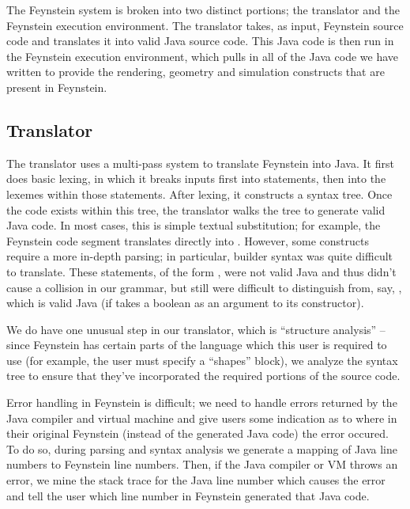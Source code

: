 The Feynstein system is broken into two distinct portions; the
translator and the Feynstein execution environment. The translator
takes, as input, Feynstein source code and translates it into valid
Java source code. This Java code is then run in the Feynstein
execution environment, which pulls in all of the Java code we have
written to provide the rendering, geometry and simulation constructs
that are present in Feynstein.

\subsection{Translator}

The translator uses a multi-pass system to translate Feynstein into
Java. It first does basic lexing, in which it breaks inputs first into
statements, then into the lexemes within those statements. After
lexing, it constructs a syntax tree. Once the code exists within this
tree, the translator walks the tree to generate valid Java code. In
most cases, this is simple textual substitution; for example, the
Feynstein code segment  translates directly into
. However, some constructs require a more
in-depth parsing; in particular, builder syntax was quite difficult to
translate. These statements, of the form
, were not valid
Java and thus didn't cause a collision in our grammar, but still were
difficult to distinguish from, say, , which is
valid Java (if  takes a boolean as an argument to its
constructor).

We do have one unusual step in our translator, which is ``structure
analysis'' -- since Feynstein has certain parts of the language which
this user is required to use (for example, the user must specify a
``shapes'' block), we analyze the syntax tree to ensure that they've
incorporated the required portions of the source code.

Error handling in Feynstein is difficult; we need to handle errors
returned by the Java compiler and virtual machine and give users some
indication as to where in their original Feynstein (instead of the
generated Java code) the error occured. To do so, during parsing and
syntax analysis we generate a mapping of Java line numbers to
Feynstein line numbers. Then, if the Java compiler or VM throws an
error, we mine the stack trace for the Java line number which causes
the error and tell the user which line number in Feynstein generated
that Java code.

